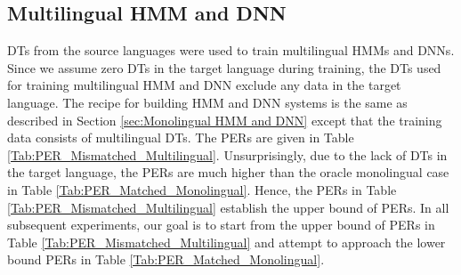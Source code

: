 \documentclass[a4paper]{article}
\begin{document}
\subsection{Multilingual HMM and DNN} \vspace{-1mm}
\label{sec:Multilingual HMM and DNN}
DTs from the source languages were used to train multilingual HMMs and DNNs. Since we assume zero DTs in the target language during training, the DTs used for training multilingual HMM and DNN exclude any data in the target language. The recipe for building HMM and DNN systems is the same as described in Section \ref{sec:Monolingual HMM and DNN} except that the training data consists of multilingual DTs. The PERs are given in Table \ref{Tab:PER_Mismatched_Multilingual}. Unsurprisingly, due to the lack of DTs in the target language, the PERs are much higher than the oracle monolingual case in Table \ref{Tab:PER_Matched_Monolingual}. Hence, the PERs in Table \ref{Tab:PER_Mismatched_Multilingual} establish the upper bound of PERs. In all subsequent experiments, our goal is to start from the upper bound of PERs in Table \ref{Tab:PER_Mismatched_Multilingual} and attempt to approach the lower bound PERs in Table \ref{Tab:PER_Matched_Monolingual}.
\end{document}

